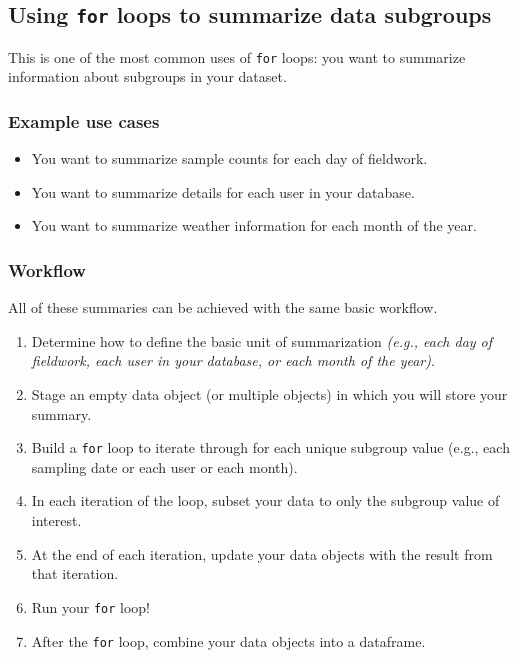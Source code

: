 \documentclass[
]{book}
\begin{document}
\hypertarget{using-for-loops-to-summarize-data-subgroups}{%
\subsection*{\texorpdfstring{Using \texttt{for} loops to summarize data subgroups}{Using for loops to summarize data subgroups}}\label{using-for-loops-to-summarize-data-subgroups}}

This is one of the most common uses of \texttt{for} loops: you want to summarize information about subgroups in your dataset.

\hypertarget{example-use-cases}{%
\subsubsection*{Example use cases}\label{example-use-cases}}

\begin{itemize}
\item
  You want to summarize sample counts for each day of fieldwork.
\item
  You want to summarize details for each user in your database.
\item
  You want to summarize weather information for each month of the year.
\end{itemize}

\hypertarget{workflow}{%
\subsubsection*{Workflow}\label{workflow}}

All of these summaries can be achieved with the same basic workflow.

\begin{enumerate}
\def\labelenumi{\arabic{enumi}.}
\item
  Determine how to define the basic unit of summarization \emph{(e.g., each day of fieldwork, each user in your database, or each month of the year)}.
\item
  Stage an empty data object (or multiple objects) in which you will store your summary.
\item
  Build a \texttt{for} loop to iterate through for each unique subgroup value (e.g., each sampling date or each user or each month).
\item
  In each iteration of the loop, subset your data to only the subgroup value of interest.
\item
  At the end of each iteration, update your data objects with the result from that iteration.
\item
  Run your \texttt{for} loop!
\item
  After the \texttt{for} loop, combine your data objects into a dataframe.
\end{enumerate}
\end{document}
